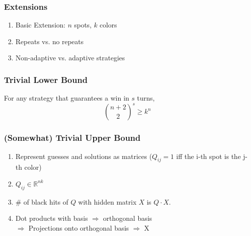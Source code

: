 \documentclass{beamer}
\begin{document}
    \begin{frame}
    	\frametitle{Extensions}
		\begin{enumerate}[label=\roman*.]
		\item Basic Extension: $n$ spots, $k$ colors
		\item Repeats vs. no repeats
		\item Non-adaptive vs. adaptive strategies
		\end{enumerate}
    \end{frame}
    
    \begin{frame}
    \frametitle{Trivial Lower Bound}
    \begin{enumerate}[label=\arabic*.]
    \end{enumerate}
	\begin{tcolorbox}[colback=blue!5,colframe=blue!40!black,title=Theorem]
	For any strategy that guarantees a win in $s$ turns, \\
	\begin{equation*}
	\binom{n+2}{2}^s \geq k^n
	\end{equation*}
	\end{tcolorbox}

    \end{frame}

    \begin{frame}
    \frametitle{(Somewhat) Trivial Upper Bound}
    \begin{enumerate}[label=\arabic*.]
	\item Represent guesses and solutions as matrices ($Q_{ij} = 1$ iff the i-th spot is the j-th color)
	\item $Q_{ij} \in \mathbb R^{nk}$
	\item \# of black hits of $Q$ with hidden matrix $X$ is  $Q\cdot X$.
	\item Dot products with basis $\Rightarrow$ orthogonal basis \\
	$\Rightarrow$ Projections onto orthogonal basis $\Rightarrow$ X
    \end{enumerate}
    \end{frame}
\end{document}
